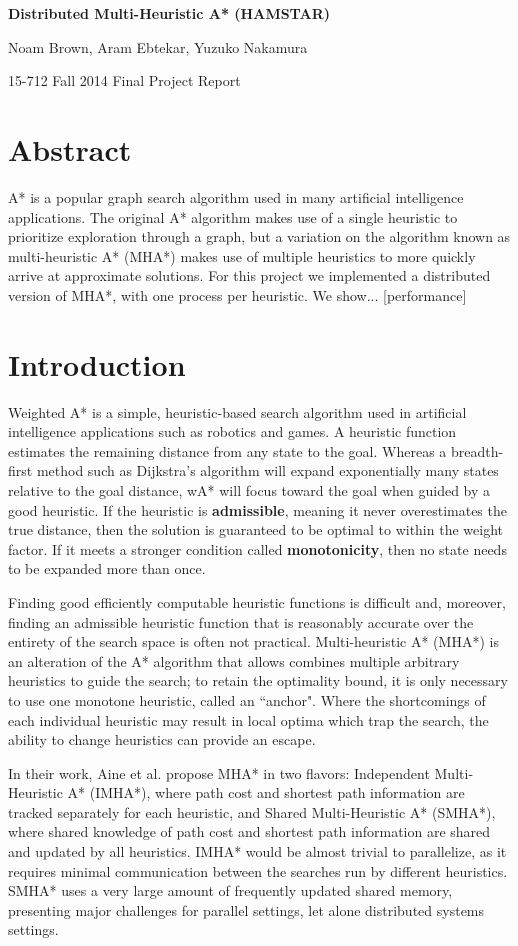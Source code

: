 \documentclass{article}
\begin{document}
\centerline{\large{\textbf{Distributed Multi-Heuristic A* (HAMSTAR)}}}
\centerline{Noam Brown, Aram Ebtekar, Yuzuko Nakamura}
\centerline{15-712 Fall 2014 Final Project Report}

\section{Abstract}

A* is a popular graph search algorithm used in many artificial intelligence applications. The original A* algorithm makes use of a single heuristic to prioritize exploration through a graph, but a variation on the algorithm known as multi-heuristic A* (MHA*) makes use of multiple heuristics to more quickly arrive at approximate solutions. For this project we implemented a distributed version of MHA*, with one process per heuristic. We show... [performance]

\section{Introduction}

Weighted A* is a simple, heuristic-based search algorithm used in artificial intelligence applications such as robotics and games. A heuristic function estimates the remaining distance from any state to the goal. Whereas a breadth-first method such as Dijkstra's algorithm will expand exponentially many states relative to the goal distance, wA* will focus toward the goal when guided by a good heuristic. If the heuristic is \textbf{admissible}, meaning it never overestimates the true distance, then the solution is guaranteed to be optimal to within the weight factor. If it meets a stronger condition called \textbf{monotonicity}, then no state needs to be expanded more than once.

Finding good efficiently computable heuristic functions is difficult and, moreover, finding an admissible heuristic function that is reasonably accurate over the entirety of the search space is often not practical. Multi-heuristic A* (MHA*) \cite{Aine14} is an alteration of the A* algorithm that allows combines multiple arbitrary heuristics to guide the search; to retain the optimality bound, it is only necessary to use one monotone heuristic, called an ``anchor". Where the shortcomings of each individual heuristic may result in local optima which trap the search, the ability to change heuristics can provide an escape.

In their work, Aine et al. propose MHA* in two flavors: Independent Multi-Heuristic A* (IMHA*), where path cost and shortest path information are tracked separately for each heuristic, and Shared Multi-Heuristic A* (SMHA*), where shared knowledge of path cost and shortest path information are shared and updated by all heuristics. IMHA* would be almost trivial to parallelize, as it requires minimal communication between the searches run by different heuristics. SMHA* uses a very large amount of frequently updated shared memory, presenting major challenges for parallel settings, let alone distributed systems settings.
\end{document}
